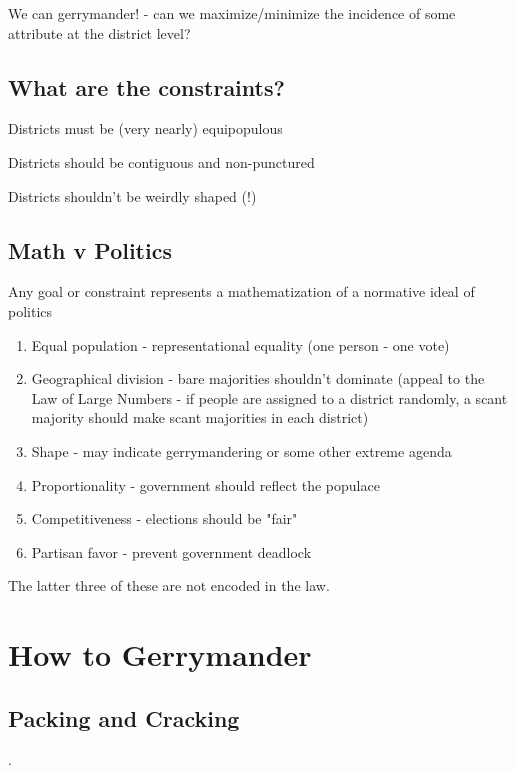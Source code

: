 We can gerrymander! - can we maximize/minimize the incidence of some attribute at the district level?

\subsection*{What are the constraints?}

Districts must be (very nearly) equipopulous

Districts should be contiguous and non-punctured

Districts shouldn't be weirdly shaped (!)

\subsection*{Math v Politics}

Any goal or constraint represents a mathematization of a normative ideal of politics

\begin{enumerate}
	\item[] Equal population - representational equality (one person - one vote)
	\item[] Geographical division - bare majorities shouldn't dominate (appeal to the Law of Large Numbers - if people are assigned to a district randomly, a scant majority should make scant majorities in each district)
	\item[] Shape - may indicate gerrymandering or some other extreme agenda
	\item[] Proportionality - government should reflect the populace
	\item[] Competitiveness - elections should be "fair"
	\item[] Partisan favor - prevent government deadlock
\end{enumerate}

The latter three of these are not encoded in the law.

\section*{How to Gerrymander}

\subsection*{Packing and Cracking}

.

